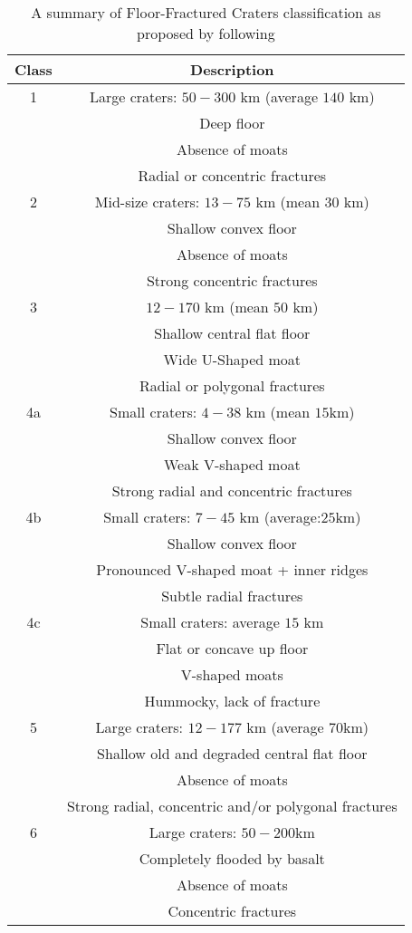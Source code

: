 \begin{table}
  \caption{A summary of Floor-Fractured Craters classification as proposed by \citet{Jozwiak:2012dq} following \citet{Schultz:1976kt}}
  \centering
  \begin{tabular}{c|c}
    \hline
    Class & Description \\
    \hline

    1 & Large craters: $50-300$ km (average $140$ km)\\
          & Deep floor \\
          & Absence of moats\\
          & Radial or concentric fractures\\
    \hline
    2 & Mid-size craters: $13-75$ km (mean $30$ km)\\
          & Shallow convex floor \\
          & Absence of moats\\
          & Strong concentric fractures\\
    \hline
    3 & $12-170$ km (mean $50$ km)\\
          & Shallow central flat floor\\
          & Wide U-Shaped moat\\
          & Radial or polygonal fractures\\
    \hline
    4a & Small craters: $4-38$ km (mean $15$km)\\
          & Shallow convex floor \\
          & Weak V-shaped moat\\
          & Strong radial and concentric fractures \\
    \hline
    4b & Small craters: $7-45$ km (average:$25$km)\\
          & Shallow convex floor \\
          & Pronounced V-shaped moat + inner ridges\\
          & Subtle radial fractures\\
    \hline
    4c & Small craters: average $15$ km \\
          & Flat or concave up floor \\
          & V-shaped moats \\
          & Hummocky, lack of fracture \\
    \hline
    5 & Large craters: $12-177$ km (average $70$km)\\
          & Shallow old and degraded central flat floor\\
          & Absence of moats \\
          & Strong radial, concentric and/or polygonal fractures\\
    \hline
    6 & Large craters: $50-200$km \\
          & Completely flooded by basalt\\
          & Absence of moats\\
          & Concentric fractures
            \label{C5-tab1}
  \end{tabular} 
\end{table}
	
